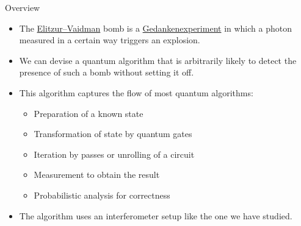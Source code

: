 
\begin{frame}{Overview}

\begin{itemize}
    \item The \href{https://en.wikipedia.org/wiki/Elitzur-Vaidman_bomb_tester}{Elitzur--Vaidman} bomb is a \href{https://en.wikipedia.org/wiki/Thought_experiment}{Gedankenexperiment} in which a photon measured in a certain way triggers an explosion.
    \item We can devise a quantum algorithm that is arbitrarily likely to detect the presence of such a bomb without setting it off.
    \item This algorithm captures the flow of most quantum algorithms:
    \begin{itemize}
        \item Preparation of a known state
        \item Transformation of state by quantum gates
        \item Iteration by passes or unrolling of a circuit
        \item Measurement to obtain the result
        \item Probabilistic analysis for correctness
    \end{itemize}
    \item The algorithm uses an interferometer setup like the one we have studied.
\end{itemize}
    
\end{frame}


